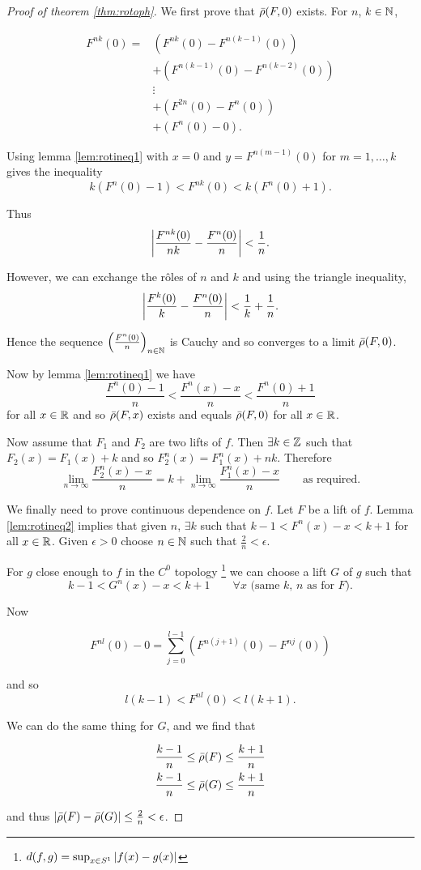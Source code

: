 \documentclass{notes}
\theoremstyle{plain}
\begin{document}
\begin{proof}[Proof of theorem \ref{thm:rotoph}]
We first prove that $\Bar{\rho}(F,0)$ exists.  For $n$, $k \in \mathbb{N}$,

\begin{align*}
F^{n k}(0) = &\left( F^{nk}(0) - F^{n(k-1)}(0) \right) \\
&+ \left( F^{n(k-1)}(0) - F^{n(k-2)}(0) \right) \\
& \vdots \\
& + \left( F^{2 n}(0) - F^n(0)\right) \\
& + \left(F^n(0) - 0 \right). 
\end{align*}

Using lemma \ref{lem:rotineq1} with $x = 0$ and
$y = F^{n(m-1)}(0)$ for $m = 1,\dots, k$ gives the inequality
\[
k \left(F^n(0) - 1 \right) < F^{n k}(0) < k \left(
F^n(0) + 1 \right).
\]

Thus
\[
\left|\frac{F^{n k}(0)}{n k} - \frac{F^n(0)}{n} \right| < \frac{1}{n}.
\]

However, we can exchange the r\^oles of $n$ and $k$ and using the triangle
inequality,
\[
\left|\frac{F^k(0)}{k} - \frac{F^n(0)}{n}\right| < \frac{1}{k} + \frac{1}{n}.
\]

Hence the sequence $\left( \frac{F^n(0)}{n} \right)_{n \in \mathbb{N}}$ is
Cauchy and so converges to a limit $\Bar{\rho}(F,0)$.

Now by lemma \ref{lem:rotineq1} we have
\[
\frac{F^n(0) - 1}{n} < \frac{F^n(x) - x}{n} < \frac{F^n(0) + 1}{n}
\]
for all $x \in \mathbb{R}$ and so $\Bar{\rho}(F,x)$ exists and
equals $\Bar{\rho}(F,0)$ for all $x \in \mathbb{R}$.

Now assume that $F_1$ and $F_2$ are two lifts of $f$.  Then
$\exists k \in \mathbb{Z}$ such that $F_2(x) = F_1(x) + k$ and
so $F_2^n(x) = F_1^n(x) + nk$.  Therefore
\[
\lim_{n \to \infty} \frac{F_2^n(x) - x}{n}
= k + \lim_{n \to \infty} \frac{F_1^n(x) - x}{n} \qquad \text{as required.}
\]

We finally need to prove continuous dependence on $f$.  Let $F$
be a lift of $f$.  Lemma \ref{lem:rotineq2} implies that
given $n$, $\exists k$ such that $k - 1 < F^n(x) - x < k+1$ for
all $x \in \mathbb{R}$.  Given $\epsilon > 0$ choose $n \in \mathbb{N}$ such
that $\tfrac{2}{n} < \epsilon$.

For $g$ close enough to $f$ in the $C^0$ topology%
\footnote{$d(f,g) = \sup_{x \in S^1} \left|f(x) - g(x)\right|$}
we can choose a lift $G$ of $g$ such that
\[
k-1 < G^n(x) - x < k+1 \qquad \forall x \text{ (same $k$, $n$ as for $F$).}
\]

Now

\[
F^{n l}(0) - 0 = \sum_{j=0}^{l-1} \left(
F^{n (j+1)}(0) - F^{nj}(0) \right)
\]

and so
\[
l (k-1) < F^{nl}(0)  < l(k+1).
\]

We can do the same thing for $G$, and we find that

\begin{gather*}
\frac{k-1}{n} \le \Bar{\rho}(F) \le \frac{k+1}{n} \\
\frac{k-1}{n} \le \Bar{\rho}(G) \le \frac{k+1}{n}
\end{gather*}

and thus $\left|\Bar{\rho}(F) - \Bar{\rho}(G)\right| \le \frac{2}{n} < \epsilon$.
\end{proof}
\end{document}
